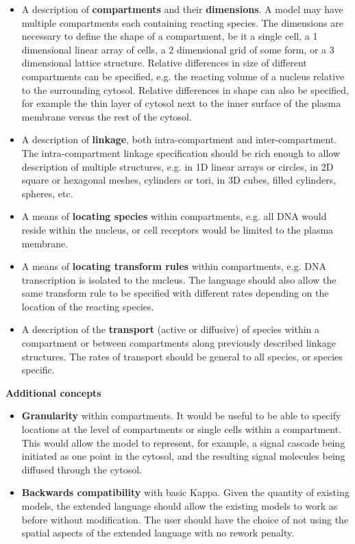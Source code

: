 \begin{itemize}
 \item A description of \textbf{compartments} and their \textbf{dimensions}. A model may have multiple compartments each containing reacting species. The dimensions are necessary to define the shape of a compartment, be it a single cell, a 1 dimensional linear array of cells, a 2 dimensional grid of some form, or a 3 dimensional lattice structure. Relative differences in size of different compartments can be specified, e.g. the reacting volume of a nucleus relative to the surrounding cytosol. Relative differences in shape can also be specified, for example the thin layer of cytosol next to the inner surface of the plasma membrane versus the rest of the cytosol.

 \item A description of \textbf{linkage}, both intra-compartment and inter-compartment. The intra-compartment linkage specification should be rich enough to allow description of multiple structures, e.g. in 1D linear arrays or circles, in 2D square or hexagonal meshes, cylinders or tori, in 3D cubes, filled cylinders, spheres, etc.

 \item A means of \textbf{locating species} within compartments, e.g. all DNA would reside within the nucleus, or cell receptors would be limited to the plasma membrane.

 \item A means of \textbf{locating transform rules} within compartments, e.g. DNA transcription is isolated to the nucleus. The language should also allow the same transform rule to be specified with different rates depending on the location of the reacting species.

 \item A description of the \textbf{transport} (active or diffusive) of species within a compartment or between compartments along previously described linkage structures. The rates of transport should be general to all species, or species specific.

\end{itemize}


\textbf{Additional concepts}

\begin{itemize}
 \item \textbf{Granularity} within compartments. It would be useful to be able to specify locations at the level of compartments or single cells within a compartment. This would allow the model to represent, for example, a signal cascade being initiated as one point in the cytosol, and the resulting signal molecules being diffused through the cytosol. 

 \item \textbf{Backwards compatibility} with basic Kappa. Given the quantity of existing models, the extended language should allow the existing models to work as before without modification. The user should have the choice of not using the spatial aspects of the extended language with no rework penalty.

\end{itemize}


